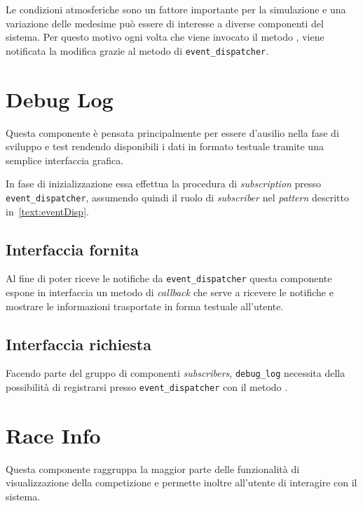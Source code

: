 Le condizioni atmosferiche sono un fattore importante per la simulazione e una variazione delle medesime può essere di interesse a diverse componenti del sistema. Per questo motivo ogni volta che viene invocato il metodo , viene notificata la modifica grazie al metodo  di \texttt{event\_dispatcher}.

\section{Debug Log}
Questa componente è pensata principalmente per essere d'ausilio nella fase di sviluppo e test rendendo disponibili i dati in formato testuale tramite una semplice interfaccia grafica.

In fase di inizializzazione essa effettua la procedura di \textit{subscription} presso \texttt{event\_dispatcher}, assumendo quindi il ruolo di \textit{subscriber} nel \textit{pattern} descritto in~\ref{text:eventDisp}.

\subsection*{Interfaccia fornita}
Al fine di poter riceve le notifiche da \texttt{event\_dispatcher} questa componente espone in interfaccia un metodo di \textit{callback} che serve a ricevere le notifiche e mostrare le informazioni trasportate in forma testuale all'utente.

\subsection*{Interfaccia richiesta}
Facendo parte del gruppo di componenti \textit{subscribers}, \texttt{debug\_log} necessita della possibilità di registrarsi presso \texttt{event\_dispatcher} con il metodo .

\section{Race Info}
Questa componente raggruppa la maggior parte delle funzionalità di visualizzazione della competizione e permette inoltre all'utente di interagire con il sistema.

